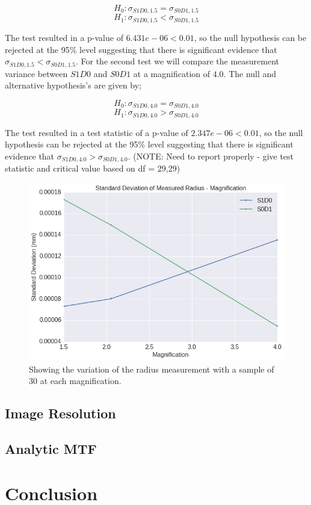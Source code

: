 \documentclass[
  twoside,
  11pt, a4paper,
  footinclude=true,
  headinclude=true,
  cleardoublepage=empty
]{scrbook}
\begin{document}
\[
H_0: \sigma_{S1D0,1.5} = \sigma_{S0D1,1.5}
\]
\[
H_1: \sigma_{S1D0,1.5} < \sigma_{S0D1,1.5}
\]

The test resulted in a p-value of $6.431e-06 < 0.01$, so the null hypothesis can be rejected at the 95\% level suggesting that there is significant evidence that $\sigma_{S1D0,1.5} < \sigma_{S0D1,1.5}$. For the second test we will compare the measurement variance between $S1D0$ and  $S0D1$ at a magnification of $4.0$. The null and alternative hypothesis's are given by;

\[
H_0: \sigma_{S1D0,4.0} = \sigma_{S0D1,4.0}
\]
\[
H_1: \sigma_{S1D0,4.0} > \sigma_{S0D1,4.0}
\]

The test resulted in a test statistic of a p-value of $2.347e-06 < 0.01$, so the null hypothesis can be rejected at the 95\% level suggesting that there is significant evidence that $\sigma_{S1D0,4.0} > \sigma_{S0D1,4.0}$. (NOTE: Need to report properly - give test statistic and critical value based on df = 29,29)

\begin{figure}[h!]
  \centering
    \includegraphics[width=\textwidth]{figures/output_34_0.png}
    \caption{Showing the variation of the radius measurement with a sample of 30 at each magnification.}
        \label{stdmeasuredradiusxsamples}
\end{figure}

\section{Image Resolution}
\section{Analytic MTF}
\chapter{Conclusion}
\end{document}
